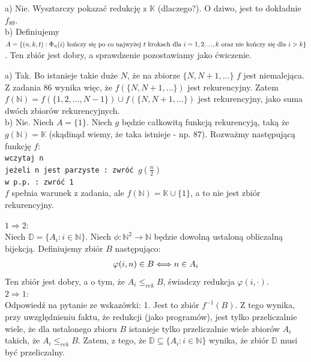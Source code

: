 \documentclass[a4paper,11pt]{article}
\newenvironment{zadanie}[1]
  {\renewcommand\theinnercustomthm{#1}\innercustomthm}
  {\endinnercustomthm}
\begin{document}
\begin{zadanie}{102}
\end{zadanie}
a) Nie. Wysztarczy pokazać redukcję z $\mathbb{K}$ (dlaczego?). O dziwo, jest to dokładnie $f_{89}$. \\

b) Definiujemy $A = \{ (n,k,t) : \Phi_n(i) \text{ kończy się po co najwyżej $t$ krokach dla } \\ 
i=1,2,...,k \text{ oraz nie kończy się dla $i > k$} \}$. Ten zbiór jest dobry, a sprawdzenie pozostawiamy jako ćwiczenie.


\begin{zadanie}{103}
\end{zadanie}
a) Tak. Bo istanieje takie duże $N$, że na zbiorze $\{ N, N+1, ... \}$ $f$ jest niemalejąca. Z zadania $86$ wynika więc, 
że $f(\{ N, N+1, ... \})$ jest rekurencyjny. Zatem $f(\mathbb{N}) = f(\{ 1,2, ... ,N-1 \}) \cup f(\{ N, N+1, ... \})$ jest
rekurencyjny, jako suma dwóch zbiorów rekurencyjnych. \\

b) Nie. Niech $A = \{1\}$. Niech $g$ będzie całkowitą funkcją rekurencyją, taką że $g(\mathbb{N}) = \mathbb{K}$ 
(skądinąd wiemy, że taka istnieje - np. $87$). Rozważmy następującą funkcję $f$: \\
\texttt{wczytaj n \\ jeżeli n jest parzyste : zwróć $g(\frac{n}{2})$ \\ w p.p. : zwróć 1 \\}
$f$ spełnia warunek z zadania, ale $f(\mathbb{N}) = \mathbb{K} \cup \{ 1 \}$, a to nie jest zbiór rekurencyjny.

\begin{zadanie}{104}
\end{zadanie}
$1 \Rightarrow 2$: \\
Niech $\mathbb{D} = \{ A_i : i \in \mathbb{N} \}$. Niech $\phi: \mathbb{N}^2 \longrightarrow \mathbb{N}$ będzie dowolną ustaloną
obliczalną bijekcją. Definiujemy zbiór $B$ następująco: \\
\begin{align}
 \varphi(i,n) \in B \Longleftrightarrow n \in A_i \notag
\end{align}
Ten zbiór jest dobry, a o tym, że $A_i \leqslant_{rek} B$, świadczy redukcja $\varphi(i,\cdot)$. \\
$2 \Rightarrow 1$: \\
Odpowiedź na pytanie ze wskazówki: 1. Jest to zbiór $f^{-1}(B)$. Z tego wynika, przy uwzględnieniu faktu, że redukcji 
(jako programów), jest tylko przeliczalnie wiele, że dla ustalonego zbioru $B$ istanieje tylko przeliczalnie wiele zbiorów
$A_i$ takich, że $A_i \leqslant_{rek} B$. Zatem, z tego, że $\mathbb{D} \subseteq \{ A_i : i \in \mathbb{N} \}$ wynika, że
zbiór $\mathbb{D}$ musi być przeliczalny.
\end{document}
